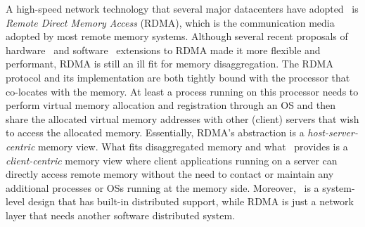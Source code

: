 A high-speed network technology that several major datacenters have adopted~\cite{AZURE-RDMA,ALIBABA-RDMA} is
{\em Remote Direct Memory Access} (RDMA),
which is the communication media adopted by most remote memory systems. %
Although several recent proposals of hardware~\cite{StRoM,Aguilera-FarMemory} and software~\cite{Tsai17-SOSP,HyperLoop} extensions to RDMA made it more flexible and performant, 
RDMA is still an ill fit for memory disaggregation.
The RDMA protocol and its implementation are both tightly bound with the processor that co-locates with the memory.
At least a process running on this processor needs to perform virtual memory allocation 
and registration through an OS and then share the allocated virtual memory addresses
with other (client) servers that wish to access the allocated memory. 
Essentially, RDMA's abstraction is a {\em host-server-centric} memory view.
What fits disaggregated memory and what \phdm\ provides is a {\em client-centric} memory view 
where client applications running on a server can directly access remote memory without the need to contact or maintain 
any additional processes or OSs running at the memory side.
Moreover, \phdm\ is a system-level design that has built-in distributed support, while RDMA is just a network layer that needs another software distributed system. 

